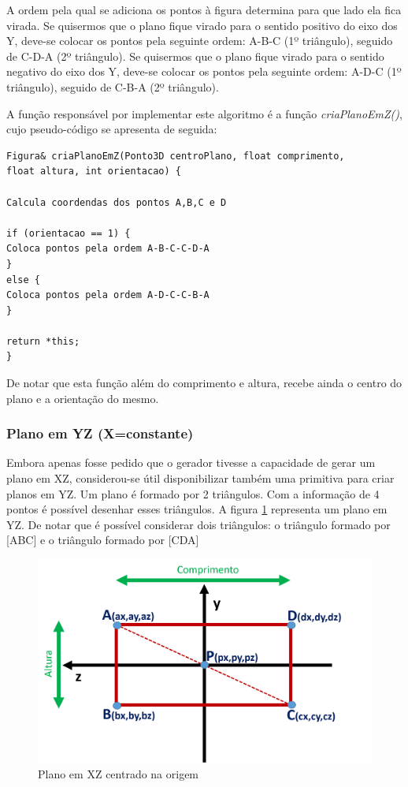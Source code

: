 A ordem pela qual se adiciona os pontos à figura determina para que lado ela fica virada. Se quisermos que o plano fique virado para o sentido positivo do eixo dos Y, deve-se colocar os pontos pela seguinte ordem: A-B-C (1º triângulo), seguido de C-D-A (2º triângulo). Se quisermos que o plano fique virado para o sentido negativo do eixo dos Y, deve-se colocar os pontos pela seguinte ordem: A-D-C (1º triângulo), seguido de C-B-A (2º triângulo).

A função responsável por implementar este algoritmo é a função \textit{criaPlanoEmZ()}, cujo pseudo-código se apresenta de seguida:

\begin{Verbatim}
Figura& criaPlanoEmZ(Ponto3D centroPlano, float comprimento, 
float altura, int orientacao) {

Calcula coordendas dos pontos A,B,C e D

if (orientacao == 1) {
Coloca pontos pela ordem A-B-C-C-D-A
}
else {
Coloca pontos pela ordem A-D-C-C-B-A
}

return *this;
}
\end{Verbatim}

De notar que esta função além do comprimento e altura, recebe ainda o centro do plano e a orientação do mesmo.

\subsubsection{Plano em YZ (X=constante)}

Embora apenas fosse pedido que o gerador tivesse a capacidade de gerar um plano em XZ, considerou-se útil disponibilizar também uma primitiva para criar planos em YZ.
Um plano é formado por 2 triângulos. Com a informação de 4 pontos é possível desenhar esses triângulos. A figura \ref{p1:fig:p3_planoX} representa um plano em YZ. De notar que é possível considerar dois triângulos: o triângulo formado por [ABC] e o triângulo formado por [CDA]

\begin{figure}[<+htpb+>]
	\centering
	\includegraphics[scale=0.5]{imagens/p3_planoX.png}
	\caption{Plano em XZ centrado na origem}
	\label{p1:fig:p3_planoX}
\end{figure}

